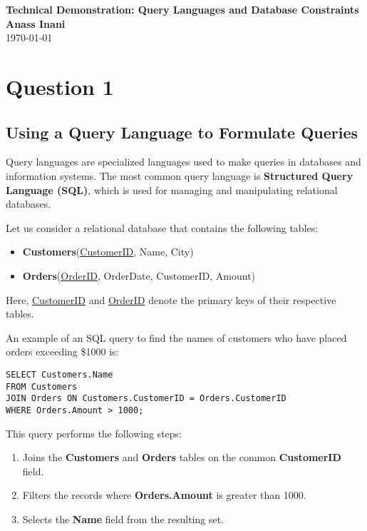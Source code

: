 \documentclass[12pt]{article}
\begin{document}
\begin{center}
    \huge\textbf{Technical Demonstration: Query Languages and Database Constraints}\\[0.5cm]
    \large\textbf{Anass Inani}\\[0.2cm]
    \large\today
\end{center}

\vspace{1cm}

\section*{Question 1}


\subsection*{Using a Query Language to Formulate Queries}

Query languages are specialized languages used to make queries in databases and information systems. The most common query language is \textbf{Structured Query Language (SQL)}, which is used for managing and manipulating relational databases.

Let us consider a relational database that contains the following tables:

\begin{itemize}
    \item \textbf{Customers}(\underline{CustomerID}, Name, City)
    \item \textbf{Orders}(\underline{OrderID}, OrderDate, CustomerID, Amount)
\end{itemize}

Here, \underline{CustomerID} and \underline{OrderID} denote the primary keys of their respective tables.

An example of an SQL query to find the names of customers who have placed orders exceeding \$1000 is:

\begin{lstlisting}[style=SQLStyle]
SELECT Customers.Name
FROM Customers
JOIN Orders ON Customers.CustomerID = Orders.CustomerID
WHERE Orders.Amount > 1000;
\end{lstlisting}

This query performs the following steps:

\begin{enumerate}
    \item Joins the \textbf{Customers} and \textbf{Orders} tables on the common \textbf{CustomerID} field.
    \item Filters the records where \textbf{Orders.Amount} is greater than 1000.
    \item Selects the \textbf{Name} field from the resulting set.
\end{enumerate}
\end{document}
